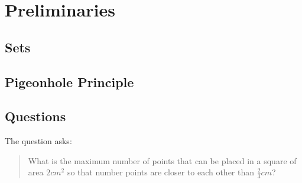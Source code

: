 \section{Preliminaries}
\label{title}


\subsection{Sets}
\label{sets}

\subsection{Pigeonhole Principle}
\label{pigeonhole-principle}

\subsection{Questions}

The question asks: 
\begin{quotation}
	What is the maximum number of points that can be placed in a square of area $2cm^2$ so that number points are closer to each other than $\frac{2}{3}cm$?
\end{quotation}

